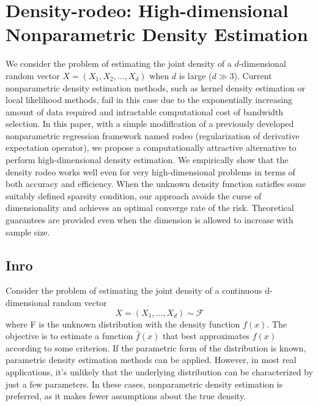 \section{Density-rodeo: High-dimensional Nonparametric Density Estimation}

We consider the problem of estimating the joint density of a $d$-dimensional random vector $X = (X_1, X_2, \dots, X_d)$ when $d$ is large ($d \gg 3$). 
Current nonparametric density estimation methods, such as kernel density estimation or local likelihood methods, fail in this case due to the exponentially increasing amount of data required and intractable computational cost of bandwidth selection. 
In this paper, with a simple modiflcation of a previously developed nonparametric regression framework named rodeo (regularization of derivative expectation operator), we propose a computationally attractive alternative to perform high-dimensional density estimation. 
We empirically show that the density rodeo works well even for very high-dimensional problems in terms of both accuracy and efficiency. 
When the unknown density function satisfles some suitably defined sparsity condition, our approach avoids the curse of dimensionality and achieves an optimal converge rate of the risk. 
Theoretical guarantees are provided even when the dimension is allowed to increase with sample size. 

\subsection{Inro}

Consider the problem of estimating the joint density of a continuous d-dimensional random vector 
\begin{equation}
    X=(X_1,\dots,X_d) \sim \mathcal{F}
\end{equation}
where F is the unknown distribution with the density function $f(x)$. 
The objective is to estimate a function $\hat{f}(x)$ that best approximates $f(x)$ according to some criterion. 
If the parametric form of the distribution is known, parametric density estimation methods can be applied. 
However, in most real applications, it’s unlikely that the underlying distribution can be characterized by just a few parameters. 
In these cases, nonparametric density estimation is preferred, as it makes fewer assumptions about the true density. 

